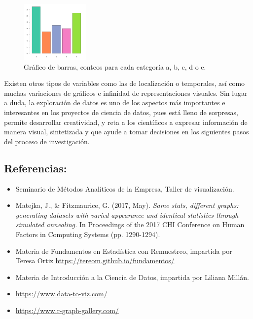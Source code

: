 \documentclass[conference, a4paper]{IEEEtran_ID}
\begin{document}
\begin{figure}[htbp]
	\centerline{\includegraphics[width=0.3\textwidth]{barplot.png}}
	\caption{Gráfico de barras, conteos para cada categoría a, b, c, d o e.}
	\label{fig_sample}
\end{figure}

Existen otros tipos de variables como las de localización o temporales, así como muchas variaciones de gráficos e infinidad de representaciones visuales. Sin lugar a duda, la exploración de datos es uno de los aspectos más importantes e interesantes en los proyectos de ciencia de datos, pues está lleno de sorpresas, permite desarrollar creatividad, y reta a los científicos a expresar información de manera visual, sintetizada y que ayude a tomar decisiones en los siguientes pasos del proceso de investigación. 


\bigskip
\bigskip

\subsection*{Referencias:}

\begin{itemize}

\item Seminario de Métodos Analíticos de la Empresa, Taller de visualización. 

\item Matejka, J., \& Fitzmaurice, G. (2017, May). \textit{Same stats, different graphs: generating datasets with varied appearance and identical statistics through simulated annealing.} In Proceedings of the 2017 CHI Conference on Human Factors in Computing Systems (pp. 1290-1294).

\item Materia de Fundamentos en Estadística con Remuestreo, impartida por Teresa Ortiz \url{https://tereom.github.io/fundamentos/}

\item Materia de Introducción a la Ciencia de Datos, impartida por Liliana Millán.

\item \url{https://www.data-to-viz.com/}

\item \url{https://www.r-graph-gallery.com/}


\end{itemize}
	
\end{document}
